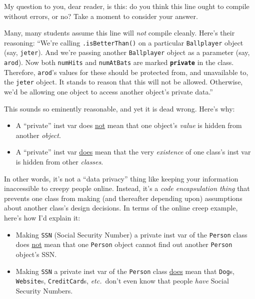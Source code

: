 My question to you, dear reader, is this: do you think this line ought to
compile without errors, or no? Take a moment to consider your answer.

Many, many students assume this line will \textit{not} compile cleanly. Here's
their reasoning: ``We're calling \texttt{.isBetterThan()} on a particular
\texttt{Ballplayer} object (say, \texttt{jeter}). And we're passing another
\texttt{Ballplayer} object as a parameter (say, \texttt{arod}). Now both
\texttt{numHits} and \texttt{numAtBats} are marked \textbf{\texttt{private}}
in the class. Therefore, \texttt{arod}'s values for these should be protected
from, and unavailable to, the \texttt{jeter} object. It stands to reason that
this will not be allowed. Otherwise, we'd be allowing one object to access
another object's private data.''

\pagebreak
This sounds so eminently reasonable, and yet it is dead wrong. Here's why:

\begin{itemize}
\itemsep.1em
\item[{\color{darkred} \XSolidBold}] A ``private'' inst var does \underline{not} mean that one object's
\textit{value} is hidden from another \textit{object}.
\item[{\color{darkgreen} \CheckmarkBold}] A ``private'' inst var \underline{does} mean that the very
\textit{existence} of one class's inst var is hidden from other
\textit{classes}.
\end{itemize}

In other words, it's not a ``data privacy'' thing like keeping your information
inaccessible to creepy people online. Instead, it's a \textit{code
encapsulation thing} that prevents one class from making (and thereafter
depending upon) assumptions about another class's design decisions. In terms
of the online creep example, here's how I'd explain it:

\begin{itemize}
\itemsep.1em
\item[{\color{darkred} \XSolidBold}] Making \texttt{SSN} (Social Security Number) a private inst var of the
\texttt{Person} class does \underline{not} mean that one \texttt{Person} object
cannot find out another \texttt{Person} object's SSN.
\item[{\color{darkgreen} \CheckmarkBold}] Making \texttt{SSN} a private inst var of the \texttt{Person} class
\underline{does} mean that \texttt{Dog}s, \texttt{Website}s,
\texttt{CreditCard}s, \textit{etc.}~don't even know that people \textit{have}
Social Security Numbers.
\end{itemize}

